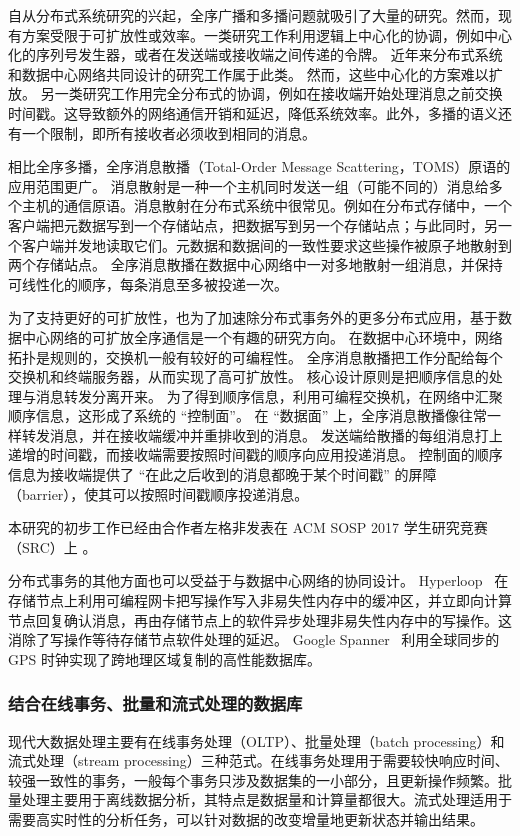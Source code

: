 自从分布式系统研究的兴起，全序广播和多播问题就吸引了大量的研究。然而，现有方案受限于可扩放性或效率。一类研究工作利用逻辑上中心化的协调，例如中心化的序列号发生器，或者在发送端或接收端之间传递的令牌。
近年来分布式系统和数据中心网络共同设计的研究工作属于此类。
然而，这些中心化的方案难以扩放。
另一类研究工作用完全分布式的协调，例如在接收端开始处理消息之前交换时间戳。这导致额外的网络通信开销和延迟，降低系统效率。此外，多播的语义还有一个限制，即所有接收者必须收到相同的消息。

相比全序多播，全序消息散播（Total-Order Message Scattering，TOMS）原语的应用范围更广。
消息散射是一种一个主机同时发送一组（可能不同的）消息给多个主机的通信原语。消息散射在分布式系统中很常见。例如在分布式存储中，一个客户端把元数据写到一个存储站点，把数据写到另一个存储站点；与此同时，另一个客户端并发地读取它们。元数据和数据间的一致性要求这些操作被原子地散射到两个存储站点。
全序消息散播在数据中心网络中一对多地散射一组消息，并保持可线性化的顺序，每条消息至多被投递一次。

为了支持更好的可扩放性，也为了加速除分布式事务外的更多分布式应用，基于数据中心网络的可扩放全序通信是一个有趣的研究方向。
在数据中心环境中，网络拓扑是规则的，交换机一般有较好的可编程性。
全序消息散播把工作分配给每个交换机和终端服务器，从而实现了高可扩放性。
核心设计原则是把顺序信息的处理与消息转发分离开来。
为了得到顺序信息，利用可编程交换机，在网络中汇聚顺序信息，这形成了系统的 ``控制面''。
在 ``数据面'' 上，全序消息散播像往常一样转发消息，并在接收端缓冲并重排收到的消息。
发送端给散播的每组消息打上递增的时间戳，而接收端需要按照时间戳的顺序向应用投递消息。
控制面的顺序信息为接收端提供了 ``在此之后收到的消息都晚于某个时间戳'' 的屏障（barrier），使其可以按照时间戳顺序投递消息。

本研究的初步工作已经由合作者左格非发表在 ACM SOSP 2017 学生研究竞赛（SRC）上 \cite{toms}。

分布式事务的其他方面也可以受益于与数据中心网络的协同设计。
Hyperloop~\cite{kim2018hyperloop} 在存储节点上利用可编程网卡把写操作写入非易失性内存中的缓冲区，并立即向计算节点回复确认消息，再由存储节点上的软件异步处理非易失性内存中的写操作。这消除了写操作等待存储节点软件处理的延迟。
Google Spanner~\cite{corbett2013spanner} 利用全球同步的 GPS 时钟实现了跨地理区域复制的高性能数据库。


\subsubsection{结合在线事务、批量和流式处理的数据库}
\label{future:reactdb}

现代大数据处理主要有在线事务处理（OLTP）、批量处理（batch processing）和流式处理（stream processing）三种范式。在线事务处理用于需要较快响应时间、较强一致性的事务，一般每个事务只涉及数据集的一小部分，且更新操作频繁。批量处理主要用于离线数据分析，其特点是数据量和计算量都很大。流式处理适用于需要高实时性的分析任务，可以针对数据的改变增量地更新状态并输出结果。

